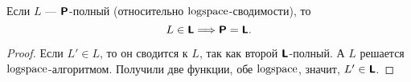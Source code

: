 \begin{thm}
	Если $ L$ --- $ \P$-полный (относительно $ \logspace$-сводимости), то
		$$ L \in \L \Longrightarrow  \P = \L.$$
\end{thm}
\begin{proof}
		Если $ L' \in L$, то он сводится к $ L$, так как второй $ \L$-полный. А $ L$ решается $ \logspace$-алгоритмом. 
			Получили две функции, обе $ \logspace$, значит, $ L' \in \L$.
\end{proof}
